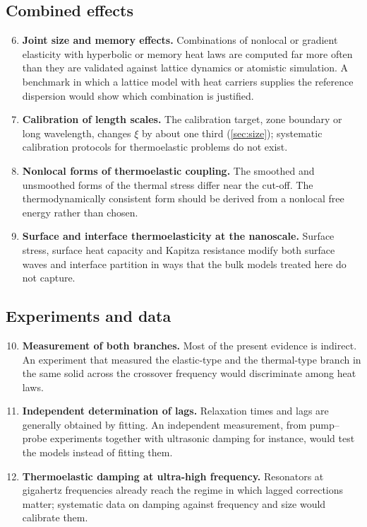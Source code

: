 \subsection{Combined effects}
\begin{enumerate}
\setcounter{enumi}{5}
\item \textbf{Joint size and memory effects.} Combinations of nonlocal or gradient elasticity with hyperbolic or memory heat laws are computed far more often than they are validated against lattice dynamics or atomistic simulation. A benchmark in which a lattice model with heat carriers supplies the reference dispersion would show which combination is justified.
\item \textbf{Calibration of length scales.} The calibration target, zone boundary or long wavelength, changes $\xi$ by about one third (\cref{sec:size}); systematic calibration protocols for thermoelastic problems do not exist.
\item \textbf{Nonlocal forms of thermoelastic coupling.} The smoothed and unsmoothed forms of the thermal stress differ near the cut-off. The thermodynamically consistent form should be derived from a nonlocal free energy rather than chosen.
\item \textbf{Surface and interface thermoelasticity at the nanoscale.} Surface stress, surface heat capacity and Kapitza resistance modify both surface waves and interface partition in ways that the bulk models treated here do not capture.
\end{enumerate}
\subsection{Experiments and data}
\begin{enumerate}
\setcounter{enumi}{9}
\item \textbf{Measurement of both branches.} Most of the present evidence is indirect. An experiment that measured the elastic-type and the thermal-type branch in the same solid across the crossover frequency would discriminate among heat laws.
\item \textbf{Independent determination of lags.} Relaxation times and lags are generally obtained by fitting. An independent measurement, from pump--probe experiments together with ultrasonic damping for instance, would test the models instead of fitting them.
\item \textbf{Thermoelastic damping at ultra-high frequency.} Resonators at gigahertz frequencies already reach the regime in which lagged corrections matter; systematic data on damping against frequency and size would calibrate them.
\end{enumerate}
